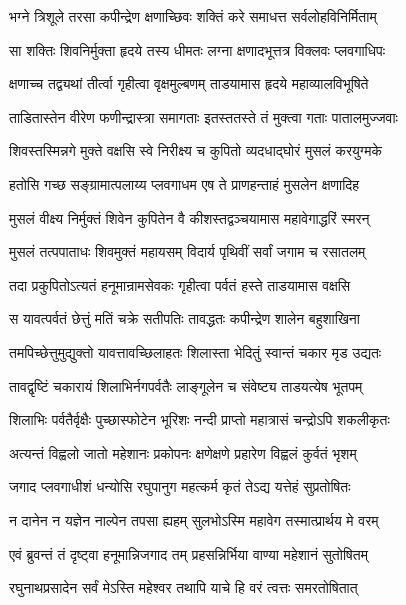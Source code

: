 \twolineshloka
{भग्ने त्रिशूले तरसा कपीन्द्रेण क्षणाच्छिवः}
{शक्तिं करे समाधत्त सर्वलोहविनिर्मिताम्}%

\twolineshloka
{सा शक्तिः शिवनिर्मुक्ता हृदये तस्य धीमतः}
{लग्ना क्षणादभूत्तत्र विक्लवः प्लवगाधिपः}%

\twolineshloka
{क्षणाच्च तद्व्यथां तीर्त्वा गृहीत्वा वृक्षमुल्बणम्}
{ताडयामास हृदये महाव्यालविभूषिते}%

\twolineshloka
{ताडितास्तेन वीरेण फणीन्द्रास्त्रा समागताः}
{इतस्ततस्ते तं मुक्त्वा गताः पातालमुज्जवाः}%

\twolineshloka
{शिवस्तस्मिन्नगे मुक्ते वक्षसि स्वे निरीक्ष्य च}
{कुपितो व्यदधाद्घोरं मुसलं करयुग्मके}%

\twolineshloka
{हतोसि गच्छ सङ्ग्रामात्पलाय्य प्लवगाधम}
{एष ते प्राणहन्ताहं मुसलेन क्षणादिह}%

\twolineshloka
{मुसलं वीक्ष्य निर्मुक्तं शिवेन कुपितेन वै}
{कीशस्तद्वञ्चयामास महावेगाद्धरिं स्मरन्}%

\twolineshloka
{मुसलं तत्पपाताधः शिवमुक्तं महायसम्}
{विदार्य पृथिवीं सर्वां जगाम च रसातलम्}%

\twolineshloka
{तदा प्रकुपितोऽत्यतं हनूमान्रामसेवकः}
{गृहीत्वा पर्वतं हस्ते ताडयामास वक्षसि}%

\twolineshloka
{स यावत्पर्वतं छेत्तुं मतिं चक्रे सतीपतिः}
{तावद्धतः कपीन्द्रेण शालेन बहुशाखिना}%

\twolineshloka
{तमपिच्छेत्तुमुद्युक्तो यावत्तावच्छिलाहतः}
{शिलास्ता भेदितुं स्वान्तं चकार मृड उद्यतः}%

\twolineshloka
{तावद्वृष्टिं चकारायं शिलाभिर्नगपर्वतैः}
{लाङ्गूलेन च संवेष्ट्य ताडयत्येष भूतपम्}%

\twolineshloka
{शिलाभिः पर्वतैर्वृक्षैः पुच्छास्फोटेन भूरिशः}
{नन्दी प्राप्तो महात्रासं चन्द्रोऽपि शकलीकृतः}%

\twolineshloka
{अत्यन्तं विह्वलो जातो महेशानः प्रकोपनः}
{क्षणेक्षणे प्रहारेण विह्वलं कुर्वतं भृशम्}%

\twolineshloka
{जगाद प्लवगाधीशं धन्योसि रघुपानुग}
{महत्कर्म कृतं तेऽद्य यत्तेहं सुप्रतोषितः}%

\twolineshloka
{न दानेन न यज्ञेन नाल्पेन तपसा ह्यहम्}
{सुलभोऽस्मि महावेग तस्मात्प्रार्थय मे वरम्}%


\twolineshloka
{एवं ब्रुवन्तं तं दृष्ट्वा हनूमान्निजगाद तम्}
{प्रहसन्निर्भिया वाण्या महेशानं सुतोषितम्}%


\twolineshloka
{रघुनाथप्रसादेन सर्वं मेऽस्ति महेश्वर}
{तथापि याचे हि वरं त्वत्तः समरतोषितात्}%

